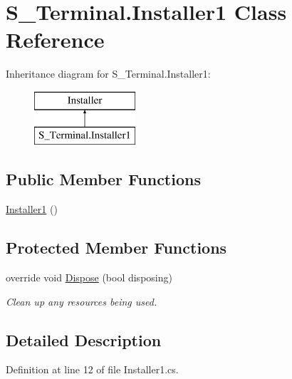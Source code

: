 \hypertarget{class_s___terminal_1_1_installer1}{\section{S\+\_\+\+Terminal.\+Installer1 Class Reference}
\label{class_s___terminal_1_1_installer1}
}
Inheritance diagram for S\+\_\+\+Terminal.\+Installer1\+:\begin{figure}[H]
\begin{center}
\leavevmode
\includegraphics[height=2.000000cm]{d8/d25/class_s___terminal_1_1_installer1}
\end{center}
\end{figure}
\subsection*{Public Member Functions}
\begin{DoxyCompactItemize}
\item 
\hyperlink{class_s___terminal_1_1_installer1_a08f1b23eba2a8c451a1d4574937f0b18}{Installer1} ()
\end{DoxyCompactItemize}
\subsection*{Protected Member Functions}
\begin{DoxyCompactItemize}
\item 
override void \hyperlink{class_s___terminal_1_1_installer1_a868953d5780427ae80467ebd12a2e913}{Dispose} (bool disposing)
\begin{DoxyCompactList}\small\item\em Clean up any resources being used. \end{DoxyCompactList}\end{DoxyCompactItemize}


\subsection{Detailed Description}


Definition at line 12 of file Installer1.\+cs.



